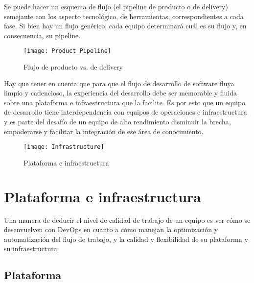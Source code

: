 Se puede hacer un esquema de flujo (el pipeline de producto o de delivery) semejante con los aspecto tecnológico, de herramientas, correspondientes a cada fase. Si bien hay un flujo genérico, cada equipo determinará cuál es su flujo y, en consecuencia, su pipeline.

\begin{figure}[h]
  \centering
  \texttt{[image: Product\_Pipeline]}
  \caption{Flujo de producto vs. de delivery}
  \centering
  \label{fig:Product_Pipeline} %
\end{figure}
\FloatBarrier %


Hay que tener en cuenta que para que el flujo de desarrollo de software fluya limpio y cadencioso, la experiencia del desarrollo debe ser memorable y fluida sobre una plataforma e infraestructura que la facilite. Es por esto que un equipo de desarrollo tiene interdependencia con equipos de operaciones e infraestructura y es parte del desafío de un equipo de alto rendimiento disminuir la brecha, empoderarse y facilitar la integración de ese área de conocimiento.

\begin{figure}[h]
  \centering
  \texttt{[image: Infrastructure]}
  \caption{Plataforma e infraestructura}
  \centering
  \label{fig:Infrastructure} %
\end{figure}
\FloatBarrier %

\section{Plataforma e infraestructura}

Una manera de deducir el nivel de calidad de trabajo de un equipo es ver cómo se desenvuelven con DevOps en cuanto a cómo manejan la optimización y automatización del flujo de trabajo, y  la calidad y flexibilidad de su plataforma y su infraestructura.


\subsection{Plataforma}


